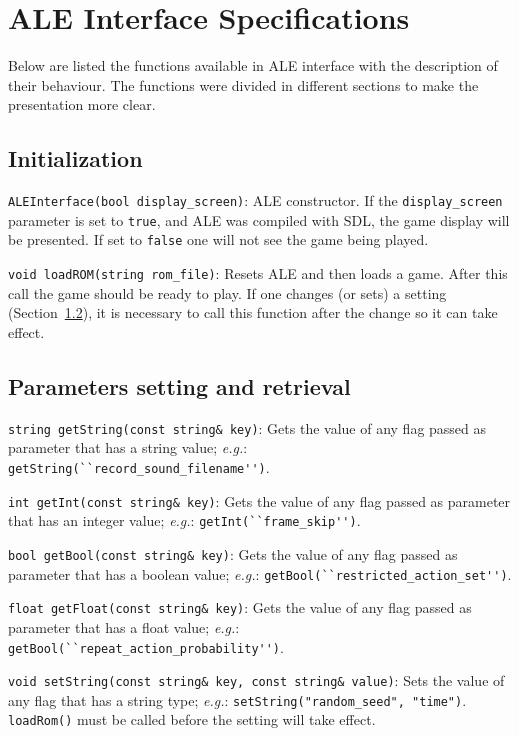 \documentclass[12pt]{article}
\begin{document}
\section{ALE Interface Specifications}\label{sec:functions}

Below are listed the functions available in ALE interface with the description of their 
behaviour. The functions were divided in different sections to make the presentation more
clear.

  \subsection{Initialization}

  \indent \indent \verb+ALEInterface(bool display_screen)+: ALE constructor. If the 
  \verb+display_screen+ parameter is set to \verb+true+, and ALE was compiled
  with SDL, the game display will be presented. If set to \verb+false+ one will not see
  the game being played.
  
  \verb+void loadROM(string rom_file)+: Resets ALE and then loads a game. After this call
  the game should be ready to play. If one changes (or sets) a setting (Section~\ref{sec:getSet}), 
  it is necessary to call this function after the change so it can take effect.
  
  \subsection{Parameters setting and retrieval}\label{sec:getSet}
  
  \indent \indent \verb+string getString(const string& key)+: Gets the value of any flag passed
  as parameter that has a string value; \emph{e.g.}: \verb+getString(``record_sound_filename'')+.

  \verb+int getInt(const string& key)+: Gets the value of any flag passed as parameter that has 
  an integer value; \emph{e.g.}: \verb+getInt(``frame_skip'')+.

  \verb+bool getBool(const string& key)+: Gets the value of any flag passed as parameter that has 
  a boolean value; \emph{e.g.}: \verb+getBool(``restricted_action_set'')+. 
  
  \verb+float getFloat(const string& key)+: Gets the value of any flag passed as parameter that has 
  a float value; \emph{e.g.}: \verb+getBool(``repeat_action_probability'')+.   
  
  \verb+void setString(const string& key, const string& value)+: Sets the value of any flag
  that has a string type; \emph{e.g.}: \verb+setString("random_seed", "time")+.
  \verb+loadRom()+ must be called before the setting will take effect.
  
\end{document}
